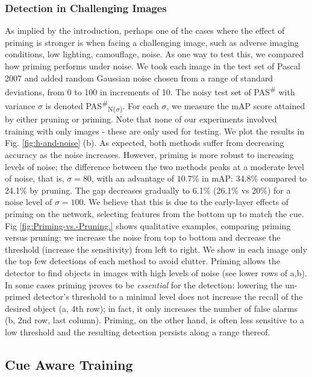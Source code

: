 \documentclass[10pt,letterpaper,twocolumn]{article}
\begin{document}
\subsubsection{Detection in Challenging Images}

As implied by the introduction, perhaps one of the cases where the
effect of priming is stronger is when facing a challenging image,
such as adverse imaging conditions, low lighting, camouflage, noise.
As one way to test this, we compared how priming performs under noise.
We took each image in the test set of Pascal 2007 and added random
Gaussian noise chosen from a range of standard deviations, from 0
to 100 in increments of 10. The noisy test set of PAS\textsuperscript{\#}
with variance $\sigma$ is denoted PAS\textsuperscript{\#}\textsubscript{N($\sigma$)}.
For each $\sigma$, we measure the mAP score attained by either pruning
or priming. Note that none of our experiments involved training with
only images - these are only used for testing. We plot the results
in Fig. \ref{fig:h-and-noise} (b). As expected, both methods suffer
from decreasing accuracy as the noise increases. However, priming
is more robust to increasing levels of noise; the difference between
the two methods peaks at a moderate level of noise, that is, $\sigma=80$,
with an advantage of $\boldsymbol{10.7}$\% in mAP: 34.8\% compared
to 24.1\% by pruning. The gap decreases gradually to 6.1\% (26.1\%
vs 20\%) for a noise level of $\sigma=100$. We believe that this
is due to the early-layer effects of priming on the network, selecting
features from the bottom up to match the cue. Fig \ref{fig:Priming-vs.-Pruning.}
shows qualitative examples, comparing priming versus pruning: we increase
the noise from top to bottom and decrease the threshold (increase
the sensitivity) from left to right. We show in each image only the
top few detections of each method to avoid clutter. Priming allows
the detector to find objects in images with high levels of noise (see
lower rows of a,b). In some cases priming proves to be \emph{essential
}for the detection: lowering the un-primed detector's threshold to
a minimal level does not increase the recall of the desired object
(a, 4th row); in fact, it only increases the number of false alarms
(b, 2nd row, last column). Priming, on the other hand, is often less
sensitive to a low threshold and the resulting detection persists
along a range thereof. 

\subsection{Cue Aware Training}
\end{document}
